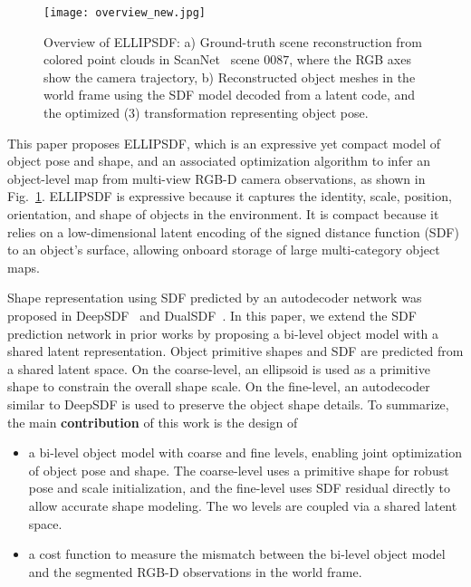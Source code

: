 \begin{figure}[t]
  \centering
  \texttt{[image: overview\_new.jpg]}
  \caption{Overview of ELLIPSDF: a) Ground-truth scene reconstruction from colored point clouds in ScanNet~\cite{dai2017scannet} scene $0087$, where the RGB axes show the camera trajectory, b) Reconstructed object meshes in the world frame using the SDF model decoded from a latent code, and the optimized (3) transformation representing object pose.}
  \label{fig:overview}
\end{figure}

This paper proposes ELLIPSDF, which is an expressive yet compact model of object pose and shape, and an associated optimization algorithm to infer an object-level map from multi-view RGB-D camera observations, as shown in Fig.~\ref{fig:overview}. ELLIPSDF is expressive because it captures the identity, scale, position, orientation, and shape of objects in the environment. It is compact because it relies on a low-dimensional latent encoding of the signed distance function (SDF) to an object's surface, allowing onboard storage of large multi-category object maps.

Shape representation using SDF predicted by an autodecoder network was proposed in DeepSDF~\cite{park2019deepsdf} and DualSDF~\cite{hao2020dualsdf}. In this paper, we extend the SDF prediction network in prior works by proposing a bi-level object model with a shared latent representation. 
Object primitive shapes and SDF are predicted from a shared latent space.
On the coarse-level, an ellipsoid is used as a primitive shape to constrain the overall shape scale. On the fine-level, an autodecoder similar to DeepSDF is used to preserve the object shape details. 
To summarize, the main \textbf{contribution} of this work is the design of
\begin{itemize}
  \item a bi-level object model with coarse and fine levels, enabling joint optimization of object pose and shape. The coarse-level uses a primitive shape for robust pose and scale initialization, and the fine-level uses SDF residual directly to allow accurate shape modeling. The wo levels are coupled via a shared latent space.
  
  \item a cost function to measure the mismatch between the bi-level object model and the segmented RGB-D observations in the world frame. 
\end{itemize}

